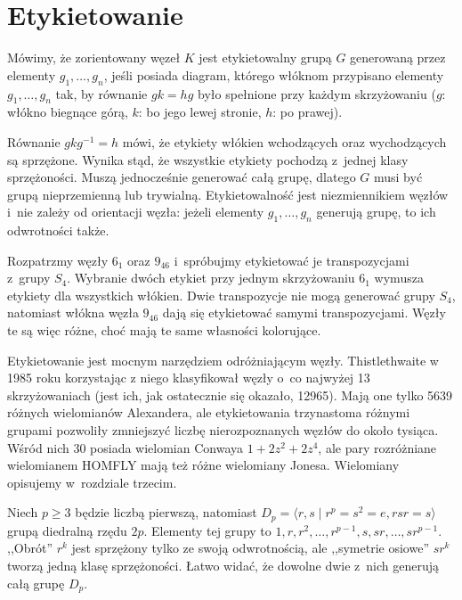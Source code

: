 
\section{Etykietowanie}


\begin{definition}[etykietowanie]
    Mówimy, że zorientowany węzeł $K$ jest etykietowalny grupą $G$ generowaną przez elementy $g_1, \ldots, g_n$, jeśli posiada diagram, którego włóknom przypisano elementy $g_1, \ldots, g_n$ tak, by równanie $gk=hg$ było spełnione przy każdym skrzyżowaniu ($g$: włókno biegnące górą, $k$: bo jego lewej stronie, $h$: po prawej).
\begin{comment}
    \[
        \LargePlusCrossingLabel
    \]
\end{comment}
\end{definition}

Równanie $gkg^{-1}=h$ mówi, że etykiety włókien wchodzących oraz wychodzących są sprzężone.
Wynika stąd, że wszystkie etykiety pochodzą z~jednej klasy sprzężoności.
Muszą jednocześnie generować całą grupę, dlatego $G$ musi być grupą nieprzemienną lub trywialną.
Etykietowalność jest niezmiennikiem węzłów i~nie zależy od orientacji węzła:
jeżeli elementy $g_1, \ldots, g_n$ generują grupę, to ich odwrotności także.

Rozpatrzmy węzły $6_1$ oraz $9_{46}$ i~spróbujmy etykietować je transpozycjami z~grupy $S_4$.
Wybranie dwóch etykiet przy jednym skrzyżowaniu $6_1$ wymusza etykiety dla wszystkich włókien.
Dwie transpozycje nie mogą generować grupy $S_4$, natomiast włókna węzła $9_{46}$ dają się etykietować samymi transpozycjami.
Węzły te są więc różne, choć mają te same własności kolorujące.

Etykietowanie jest mocnym narzędziem odróżniającym węzły.
Thistlethwaite w 1985 roku korzystając z niego klasyfikował węzły o~co najwyżej 13 skrzyżowaniach (jest ich, jak ostatecznie się okazało, 12965).
Mają one tylko 5639 różnych wielomianów Alexandera, ale etykietowania trzynastoma różnymi grupami pozwoliły zmniejszyć liczbę nierozpoznanych węzłów do około tysiąca.
Wśród nich 30 posiada wielomian Conwaya $1 + 2z^2 + 2z^4$, ale pary rozróżniane wielomianem HOMFLY mają też różne wielomiany Jonesa.
Wielomiany opisujemy w~rozdziale trzecim.

Niech $p \ge 3$ będzie liczbą pierwszą, natomiast $D_p = \langle r, s \mid r^p = s^2 = e, rsr = s \rangle$ grupą diedralną rzędu $2p$.
Elementy tej grupy to $1, r, r^2, \ldots, r^{p-1}, s, sr, \ldots, sr^{p-1}$.
,,Obrót'' $r^k$ jest sprzężony tylko ze swoją odwrotnością, ale ,,symetrie osiowe'' $sr^k$ tworzą jedną klasę sprzężoności.
Łatwo widać, że dowolne dwie z~nich generują całą grupę $D_p$.

